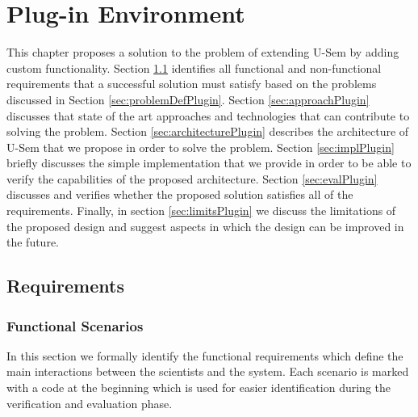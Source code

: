 
\chapter{Plug-in Environment}

This chapter proposes a solution to the problem of extending U-Sem by adding custom functionality. Section \ref{sec:requirementsPlugin} identifies all functional and non-functional requirements that a successful solution must satisfy based on the problems discussed in Section \ref{sec:problemDefPlugin}. Section \ref{sec:approachPlugin} discusses that state of the art approaches and technologies that  can contribute to solving the problem. Section \ref{sec:architecturePlugin} describes the architecture of U-Sem that we propose in order to solve the problem. Section \ref{sec:implPlugin} briefly discusses the simple implementation that we provide in order to be able to verify the capabilities of the proposed architecture. Section \ref{sec:evalPlugin} discusses and verifies whether the proposed solution satisfies all of the requirements. Finally, in section \ref{sec:limitsPlugin} we discuss the limitations of the proposed design and suggest aspects in which the design can be improved in the future.


\section{Requirements}
\label{sec:requirementsPlugin}

\subsection{Functional Scenarios}
In this section we formally identify the functional requirements which define the main interactions between the scientists and the system. Each scenario is marked with a code at the beginning which is used for easier identification during the verification and evaluation phase.

